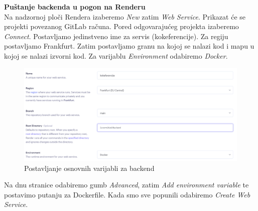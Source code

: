         \textbf{Puštanje backenda u pogon na Renderu}\\
            Na nadzornoj ploči Rendera izaberemo \textit{New} zatim \textit{Web Service}. Prikazat će se projekti povezanog GitLab računa. Pored odgovarajućeg projekta izaberemo \textit{Connect}. Postavljamo jedinstveno ime za servis (kokeferencije). Za regiju postavljamo Frankfurt. Zatim postavljamo granu na kojoj se nalazi kod i mapu u kojoj se nalazi izvorni kod. Za varijablu \textit{Environment} odabiremo \textit{Docker}.\\
            \begin{figure}[H]
                 \includegraphics[width=\textwidth]{slike/Postavljanje backend za pogon.png}
                \centering
                 \caption{Postavljanje osnovnih varijabli za backend}
                 \label{fig:backend(1)}
                 \end{figure}
        Na dnu stranice odabiremo gumb \textit{Advanced}, zatim \textit{Add environment variable} te postavimo putanju za Dockerfile. Kada smo sve popunili odabiremo \textit{Create Web Service}.\\\\

